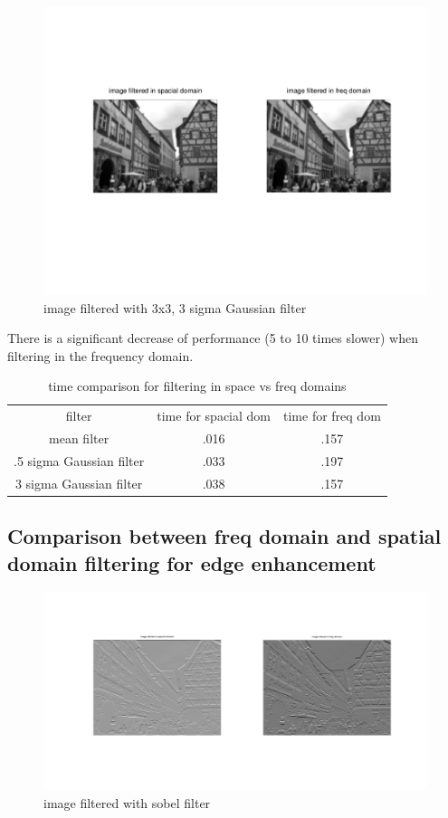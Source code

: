 \documentclass{article}
\begin{document}
	\begin{figure}[H]
		\includegraphics[width=\linewidth]{Q7/partB3.png}
		\caption{image filtered with 3x3, 3 sigma Gaussian filter}
	\end{figure}
	
	There is a significant decrease of performance (5 to 10 times slower) when filtering in the frequency domain.
	\begin{table}[H]
		\centering
		\begin{tabular}{ c | c | c }
			filter & time for spacial dom & time for freq dom \\
			mean filter & .016 & .157 \\
			.5 sigma Gaussian filter & .033 & .197 \\
			3 sigma Gaussian filter & .038 & .157 \\
		\end{tabular}
		\caption{time comparison for filtering in space vs freq domains}
	\end{table}
	
	\subsection{Comparison between freq domain and spatial domain filtering for edge enhancement}
	
	\begin{figure}[H]
		\includegraphics[width=\linewidth]{Q7/partC1.png}
		\caption{image filtered with sobel filter}
	\end{figure}
	
\end{document}
